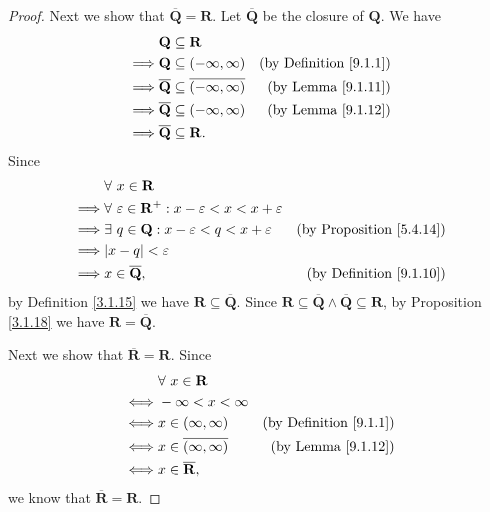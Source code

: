 \begin{proof}
    Next we show that \(\overline{\mathbf{Q}} = \mathbf{R}\).
    Let \(\overline{\mathbf{Q}}\) be the closure of \(\mathbf{Q}\).
    We have
    \begin{align*}
                 & \mathbf{Q} \subseteq \mathbf{R}                                                                   \\
        \implies & \mathbf{Q} \subseteq (-\infty, \infty)                       & \text{(by Definition \ref{9.1.1})} \\
        \implies & \overline{\mathbf{Q}} \subseteq \overline{(-\infty, \infty)} & \text{(by Lemma \ref{9.1.11})}     \\
        \implies & \overline{\mathbf{Q}} \subseteq (-\infty, \infty)            & \text{(by Lemma \ref{9.1.12})}     \\
        \implies & \overline{\mathbf{Q}} \subseteq \mathbf{R}.
    \end{align*}
    Since
    \begin{align*}
                 & \forall\ x \in \mathbf{R}                                                                                            \\
        \implies & \forall\ \varepsilon \in \mathbf{R}^+ : x - \varepsilon < x < x + \varepsilon                                        \\
        \implies & \exists\ q \in \mathbf{Q} : x - \varepsilon < q < x + \varepsilon             & \text{(by Proposition \ref{5.4.14})} \\
        \implies & \abs*{x - q} < \varepsilon                                                                                           \\
        \implies & x \in \overline{\mathbf{Q}},                                                  & \text{(by Definition \ref{9.1.10})}
    \end{align*}
    by Definition \ref{3.1.15} we have \(\mathbf{R} \subseteq \overline{\mathbf{Q}}\).
    Since \(\mathbf{R} \subseteq \overline{\mathbf{Q}} \land \overline{\mathbf{Q}} \subseteq \mathbf{R}\), by Proposition \ref{3.1.18} we have \(\mathbf{R} = \overline{\mathbf{Q}}\).

    Next we show that \(\overline{\mathbf{R}} = \mathbf{R}\).
    Since
    \begin{align*}
             & \forall\ x \in \mathbf{R}                                              \\
        \iff & -\infty < x < \infty                                                   \\
        \iff & x \in (\infty, \infty)            & \text{(by Definition \ref{9.1.1})} \\
        \iff & x \in \overline{(\infty, \infty)} & \text{(by Lemma \ref{9.1.12})}     \\
        \iff & x \in \overline{\mathbf{R}},
    \end{align*}
    we know that \(\overline{\mathbf{R}} = \mathbf{R}\).


\end{proof}
